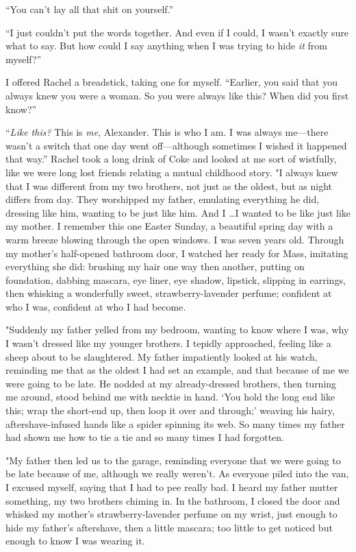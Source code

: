 ``You can't lay all that shit on yourself.''

``I just couldn't put the words together. And even if I could, I wasn't
exactly sure what to say. But how could I say anything when I was trying
to hide \emph{it} from myself?''

I offered Rachel a breadstick, taking one for myself. ``Earlier, you
said that you always knew you were a woman. So you were always like
this? When did you first know?''

``\emph{Like this?} This is \emph{me}, Alexander. This is who I am. I
was always me---there wasn't a switch that one day went off---although
sometimes I wished it happened that way.'' Rachel took a long drink of
Coke and looked at me sort of wistfully, like we were long lost friends
relating a mutual childhood story. "I always knew that I was different
from my two brothers, not just as the oldest, but as night differs from
day. They worshipped my father, emulating everything he did, dressing
like him, wanting to be just like him. And I \ldots I wanted to be like
just like my mother. I remember this one Easter Sunday, a beautiful
spring day with a warm breeze blowing through the open windows. I was
seven years old. Through my mother's half-opened bathroom door, I
watched her ready for Mass, imitating everything she did: brushing my
hair one way then another, putting on foundation, dabbing mascara, eye
liner, eye shadow, lipstick, slipping in earrings, then whisking a
wonderfully sweet, strawberry-lavender perfume; confident at who I was,
confident at who I had become.

"Suddenly my father yelled from my bedroom, wanting to know where I was,
why I wasn't dressed like my younger brothers. I tepidly approached,
feeling like a sheep about to be slaughtered. My father impatiently
looked at his watch, reminding me that as the oldest I had set an
example, and that because of me we were going to be late. He nodded at
my already-dressed brothers, then turning me around, stood behind me
with necktie in hand. `You hold the long end like this; wrap the
short-end up, then loop it over and through;' weaving his hairy,
aftershave-infused hands like a spider spinning its web. So many times
my father had shown me how to tie a tie and so many times I had
forgotten.

"My father then led us to the garage, reminding everyone that we were
going to be late because of me, although we really weren't. As everyone
piled into the van, I excused myself, saying that I had to pee really
bad. I heard my father mutter something, my two brothers chiming in. In
the bathroom, I closed the door and whisked my mother's
strawberry-lavender perfume on my wrist, just enough to hide my father's
aftershave, then a little mascara; too little to get noticed but enough
to know I was wearing it.

